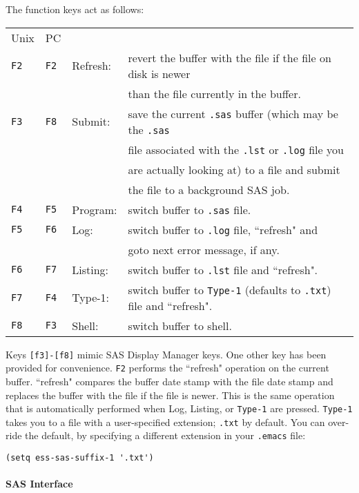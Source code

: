 \documentclass{article}
\begin{document}
The function keys act as follows:\\
\begin{tabular}{llll}
Unix& PC&\\
\tt F2  &\tt  F2& Refresh:&revert the buffer with the file if the file on disk is newer\\
\tt 	&\tt 	&	  &	  than the file currently in the buffer.\\
\tt F3  &\tt  F8& Submit: &save   the current {\tt .sas} buffer (which may be the {\tt .sas}\\
\tt 	&\tt 	&	  &	  file associated with the {\tt .lst} or {\tt .log} file you\\
\tt 	&\tt 	&	  &	  are actually looking at) to a file and submit\\
\tt 	&\tt 	&	  &	  the file to a background SAS job.\\
\tt F4  &\tt  F5& Program:&switch buffer to {\tt .sas} file.\\
\tt F5  &\tt  F6& Log:    &switch buffer to {\tt .log} file, ``refresh" and \\
\tt 	&\tt 	&	  &	   goto next error message, if any.\\
\tt F6  &\tt  F7& Listing:&switch buffer to {\tt .lst} file and ``refresh".\\
\tt F7  &\tt  F4& Type-1: &switch buffer to {\tt Type-1} (defaults to {\tt .txt}) file and ``refresh".\\
\tt F8  &\tt  F3& Shell:  &switch buffer to shell.\\
\end{tabular}


Keys {\tt [f3]-[f8]} mimic SAS Display Manager keys.  One other key has been
provided for convenience.  {\tt F2} performs the ``refresh" operation on the
current buffer.  ``refresh" compares the buffer date stamp with the
file date stamp and replaces the buffer with the file if the file is
newer.  This is the same operation that is automatically performed
when Log, Listing, or {\tt Type-1} are pressed.  {\tt Type-1} takes you to a file
with a user-specified extension; {\tt .txt} by default.  You can over-ride
the default, by specifying a different extension in your {\tt .emacs} file:
\begin{verbatim}
(setq ess-sas-suffix-1 '.txt')
\end{verbatim}

\paragraph{SAS Interface}
\label{sec:SAS:interface}
\end{document}
